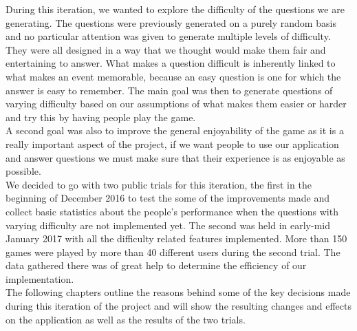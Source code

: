 During this iteration, we wanted to explore the difficulty of the questions we are generating. The questions were previously generated on a purely random basis and no particular attention was given to generate multiple levels of difficulty. They were all designed in a way that we thought would make them fair and entertaining to answer. What makes a question difficult is inherently linked to what makes an event memorable, because an easy question is one for which the answer is easy to remember. The main goal was then to generate questions of varying difficulty based on our assumptions of what makes them easier or harder and try this by having people play the game.\\
A second goal was also to improve the general enjoyability of the game as it is a really important aspect of the project, if we want people to use our application and answer questions we must make sure that their experience is as enjoyable as possible.\\
We decided to go with two public trials for this iteration, the first in the beginning of December 2016 to test the some of the improvements made and collect basic statistics about the people's performance when the questions with varying difficulty are not implemented yet. The second was held in early-mid January 2017 with all the difficulty related features implemented. More than 150 games were played by more than 40 different users during the second trial. The data gathered there was of great help to determine the efficiency of our implementation.\\
The following chapters outline the reasons behind some of the key decisions made during this iteration of the project and will show the resulting changes and effects on the application as well as the results of the two trials.